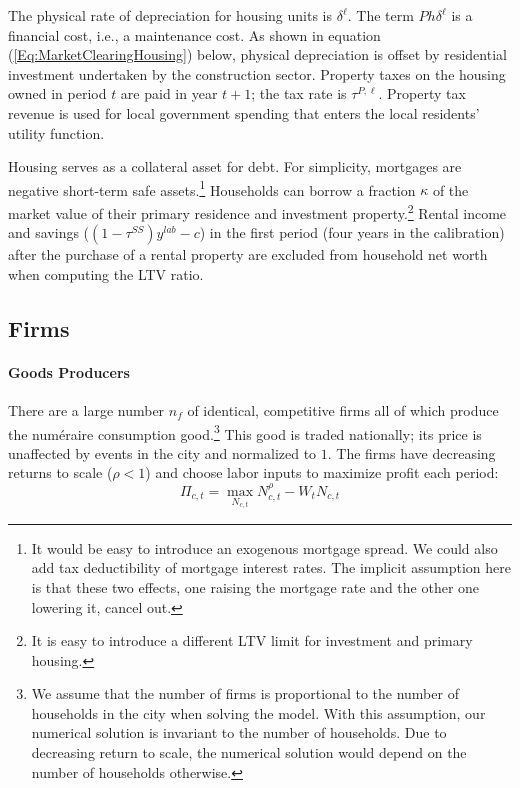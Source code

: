 \documentclass[letterpaper,12pt,dvipsnames,usenames]{article}
\theoremstyle{definition}
\begin{document}
\begin{spacing}{1.25}
The physical rate of depreciation for  housing units is $\delta^{\ell}$. The term $Ph\delta^{\ell}$ is a financial cost, i.e., a maintenance cost.  As shown in equation (\ref{Eq:MarketClearingHousing}) below, physical depreciation is offset by residential investment undertaken by the construction sector.%
 Property taxes on the housing owned in period $t$ are paid in year $t+1$; the tax rate is $\tau^{P,\ell}$. Property tax revenue is used for local government spending  that enters the local residents' utility function.

Housing serves as a collateral asset for debt. For simplicity, mortgages are negative short-term safe assets.\footnote{It would be easy to introduce an exogenous mortgage spread. We could also add tax deductibility of mortgage interest rates. The implicit assumption here is that these two effects, one raising the mortgage rate and the other one lowering it, cancel out.} Households can borrow a fraction $\kappa$ of the market value of their primary residence and  investment property.\footnote{It is easy to introduce a different LTV limit for investment and primary housing.} Rental income and savings ($(1-\tau^{SS})y^{lab}-c$) in the first period (four years in the calibration) after the purchase of a rental property are excluded from household net worth when computing the LTV ratio.


\subsection{Firms}

\paragraph{Goods Producers} There are a large number $n_{f}$ of identical, competitive firms all of which produce the num\'eraire consumption good.\footnote{We assume that the number of firms is proportional to the number of households in the city when solving the model. With this assumption, our numerical solution is invariant to the number of households. Due to decreasing return to scale, the numerical solution would depend on the number of households otherwise.} This good is traded nationally; its price is unaffected by events in the city and normalized to $1$. The firms have decreasing returns to scale ($\rho<1$) and choose labor inputs to maximize profit each period:
\begin{equation}
\Pi_{c,t}=\max_{N_{c,t}} N_{c,t}^{\rho}-W_{t}N_{c,t}
\end{equation}


\end{spacing}
\end{document}
